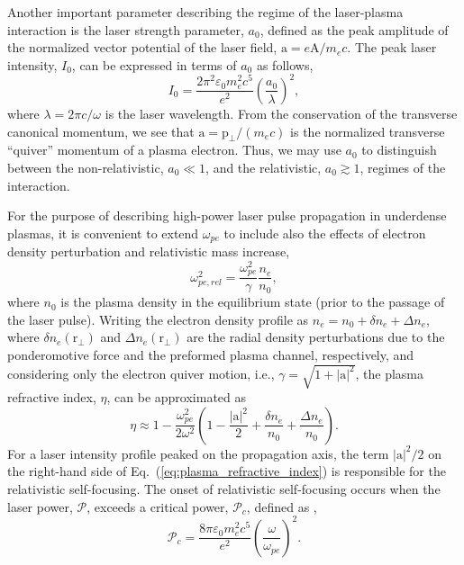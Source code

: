 \documentclass[10pt, a4paper, twoside, openright]{report}
\newcommand{\q}[1]{``#1''} %
\newcommand{\norm}[1]{|#1|}
\renewcommand{\vec}[1]{\boldsymbol{\mathrm{#1}}}
\begin{document}
Another important parameter describing the regime of the laser-plasma interaction is the laser strength parameter, $ a_0 $, defined as the peak amplitude of the normalized vector potential of the laser field, $ \vec{a} = e \vec{A} / m_e c $. The peak laser intensity, $ I_0 $, can be expressed in terms of $ a_0 $ as follows,
\begin{equation}\label{eq:laser_intensity}
	I_0 = \frac{2 \pi^2 \varepsilon_0 m_e^2 c^5}{e^2} \left( \frac{a_0}{\lambda} \right)^2,
\end{equation} 
where $ \lambda = 2 \pi c / \omega $ is the laser wavelength. From the conservation of the transverse canonical momentum, we see that $ \vec{a} = \vec{p}_{\bot} / \left( m_e c \right) $ is the normalized transverse \q{quiver} momentum of a plasma electron. Thus, we may use $ a_0 $ to distinguish between the non-relativistic, $ a_0 \ll 1 $, and the relativistic, $ a_0 \gtrsim 1 $, regimes of the interaction. %

For the purpose of describing high-power laser pulse propagation in underdense plasmas, it is convenient to extend $ \omega_{pe} $ to include also the effects of electron density perturbation and relativistic mass increase,
\begin{equation}\label{eq:langmuir_freq_rel}
	\omega_{pe, rel}^2 = \frac{\omega_{pe}^2}{\gamma} \frac{n_e}{n_0},
\end{equation}
where $ n_0 $ is the plasma density in the equilibrium state (prior to the passage of the laser pulse). Writing the electron density profile as $ n_e = n_0 + \delta n_e + \Delta n_e $, where $ \delta n_e \left( \vec{r}_{\bot} \right) $ and $ \Delta n_e \left( \vec{r}_{\bot} \right) $ are the radial density perturbations due to the ponderomotive force and the preformed plasma channel, respectively, and considering only the electron quiver motion, i.e., $ \gamma = \sqrt{1 + \norm{\vec{a}}^2} $, the plasma refractive index, $ \eta $, can be approximated as \cite{Esarey1997}
\begin{equation}\label{eq:plasma_refractive_index}
	\eta \approx 1 - \frac{\omega_{pe}^2}{2 \omega^2} \left( 1 - \frac{\norm{\vec{a}}^2}{2} + \frac{\delta n_e}{n_0} + \frac{\Delta n_e}{n_0} \right).
\end{equation}
For a laser intensity profile peaked on the propagation axis, the term $ \norm{\vec{a}}^2 / 2 $ on the right-hand side of Eq.~(\ref{eq:plasma_refractive_index}) is responsible for the relativistic self-focusing. The onset of relativistic self-focusing occurs when the laser power, $ \mathcal{P} $, exceeds a critical power, $ \mathcal{P}_c $, defined as \cite{Sun1987},
\begin{equation}\label{eq:critical_power}
	\mathcal{P}_c = \frac{8 \pi \varepsilon_0 m_e^2 c^5}{e^2} \left( \frac{\omega}{\omega_{pe}} \right)^2.
\end{equation}
\end{document}
